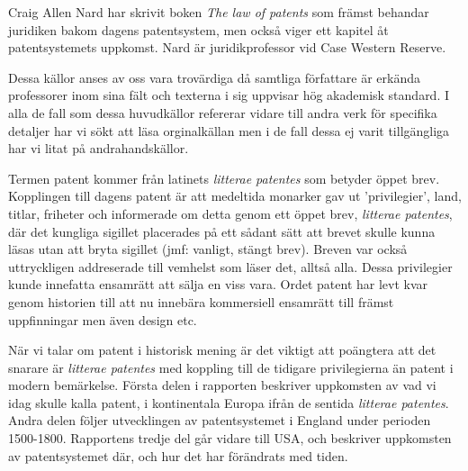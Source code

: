 Craig Allen Nard har skrivit boken \emph{The law of patents} som främst 
behandar juridiken bakom dagens patentsystem, men också viger ett kapitel åt 
patentsystemets uppkomst. Nard är juridikprofessor vid Case Western Reserve.

Dessa källor anses av oss vara trovärdiga då samtliga författare är erkända 
professorer inom sina fält och texterna i sig uppvisar hög akademisk standard. 
I alla de fall som dessa huvudkällor refererar vidare till andra verk för 
specifika detaljer har vi sökt att läsa orginalkällan men i de fall dessa ej 
varit tillgängliga har vi litat på andrahandskällor.

Termen patent kommer från latinets \emph{litterae patentes} som
betyder öppet brev. Kopplingen till dagens patent är att medeltida monarker gav
ut 'privilegier', land, titlar, friheter och informerade om detta genom ett
öppet brev, \emph{litterae patentes}, där det kungliga sigillet placerades på
ett sådant sätt att brevet skulle kunna läsas utan att bryta sigillet (jmf: 
vanligt, stängt brev). Breven var också uttryckligen addreserade till 
vemhelst som läser det, alltså alla. Dessa privilegier kunde innefatta ensamrätt
att sälja en viss vara. Ordet patent har levt kvar genom historien till 
att nu innebära kommersiell ensamrätt till främst uppfinningar men även 
design etc. \cite{blackstone vad hänvisas?}

När vi talar om patent i historisk mening är det viktigt att poängtera att det 
snarare är \emph{litterae patentes} med koppling till de tidigare 
privilegierna än patent i modern bemärkelse. Första delen i rapporten beskriver
uppkomsten av vad vi idag skulle kalla patent, i kontinentala Europa ifrån de
sentida \emph{litterae patentes}. Andra delen följer utvecklingen av
patentsystemet i England under perioden 1500-1800. Rapportens tredje del går
vidare till USA, och beskriver uppkomsten av patentsystemet där, och hur det har
förändrats med tiden.

